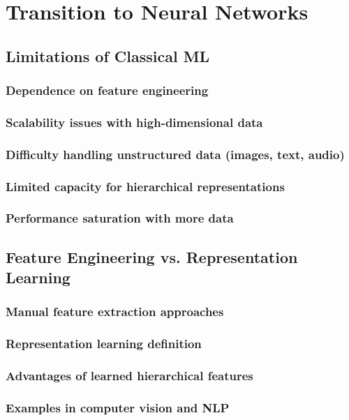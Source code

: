 \chapter{Transition to Neural Networks}

\section{Limitations of Classical ML}
\subsection{Dependence on feature engineering}
\subsection{Scalability issues with high-dimensional data}
\subsection{Difficulty handling unstructured data (images, text, audio)}
\subsection{Limited capacity for hierarchical representations}
\subsection{Performance saturation with more data}

\section{Feature Engineering vs. Representation Learning}
\subsection{Manual feature extraction approaches}
\subsection{Representation learning definition}
\subsection{Advantages of learned hierarchical features}
\subsection{Examples in computer vision and NLP}
